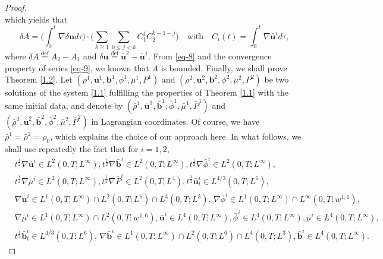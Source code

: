 \documentclass[11pt]{article}
\numberwithin{equation}{section}
\begin{document}
\begin{proof}
\begin{equation}
\end{equation}
which yields that
\begin{equation}
\delta A = \big( \int_0^t \nabla \delta \mathbf{u} d\tau \big) \cdot \big( \sum_{k \geq 1} \sum_{0 \leq j < k} C_1^j C_2^{k - 1 - j} \big) \quad \text{with} \quad C_i(t) = \int_0^t \nabla \bar{\mathbf{u}}^i d\tau, \label{eq-7}
\end{equation}
where \( \delta A \stackrel{\text{def}}{=} A_2 - A_1 \) and \( \delta \mathbf{u} \stackrel{\text{def}}{=} \bar{\mathbf{u}}^2 - \bar{\mathbf{u}}^1 \). From \eqref{eq-8} and the convergence property of series \eqref{eq-9}, we known that $A$ is bounded.
Finally, we shall prove   Theorem \ref{1.2}. Let $(\rho^1, \mathbf{u}^1, \mathbf{b}^1, \phi^1,\mu^1, P^1)$  and $(\rho^2, \mathbf{u}^2, \mathbf{b}^2, \phi^2,\mu^2,P^2)$ be two solutions of the system \eqref{1.1} fulfilling the properties of Theorem \ref{1.1} with the same initial data, and denote by \((\bar{\rho}^1, \bar{\mathbf{u}}^1, \bar{\mathbf{b}}^1, \bar{\phi}^1,\bar{\mu}^1,  \bar{P}^1)\) and \((\bar{\rho}^2, \bar{\mathbf{u}}^2, \bar{\mathbf{b}}^2, \bar{\phi}^2, \bar{\mu}^2, \bar{P}^2)\) in Lagrangian coordinates. Of course, we have \(\bar{\rho}^1 = \bar{\rho}^2 = \rho_0\), which explains the choice of our approach here. In what follows, we shall use repeatedly the fact that for \( i = 1,2 \),
\begin{equation}
\begin{split}\label{eq-5}
&t^{\frac{1}{2}} \nabla \bar{\mathbf{u}}^i \in L^2(0,T; L^\infty), t^{\frac{1}{2}} \nabla \bar{\mathbf{b}}^i \in L^2(0,T; L^\infty),
t^{\frac{1}{2}} \nabla \bar{\phi}^i \in L^2(0,T; L^\infty), \\
&t^{\frac{1}{2}} \nabla \bar{\mu}^i \in L^2(0,T; L^\infty),
t^{\frac{1}{2}} \nabla \bar{P}^i \in L^2(0,T; L^4),
t^{\frac{1}{2}} \bar{\mathbf{u}}_t^i \in L^{4/3}(0,T; L^6), \\
&\nabla \bar{\mathbf{u}}^i \in L^1(0,T; L^\infty) \cap L^2(0,T; L^6) \cap L^4(0,T; L^3),\, \nabla \bar{\phi}^i \in L^1(0,T; L^\infty) \cap L^\infty(0,T; w^{1,6}) ,\\
&\nabla \bar{\mu}^i \in L^1(0,T; L^\infty) \cap L^2(0,T; w^{1,6}) ,
\bar{\mathbf{u}}^i \in L^4(0,T; L^\infty),\bar{\phi}^i \in L^4(0,T; L^\infty),\bar{\mu}^i \in L^4(0,T; L^\infty),\\
&t^{\frac{1}{2}} \bar{\mathbf{b}}_t^i \in L^{4/3}(0,T; L^6), \, \nabla \bar{\mathbf{b}}^i \in L^1(0,T; L^\infty) \cap L^2(0,T; L^6) \cap L^4(0,T; L^3), \bar{\mathbf{b}}^i \in L^4(0,T; L^\infty).
\end{split}

\end{equation}
\end{proof}
\end{document}
